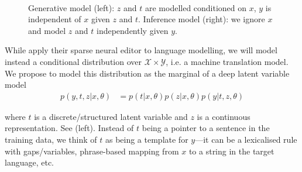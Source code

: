 \begin{figure}[t]
    \centering

    ~

    \caption{Generative model (left): $z$ and $t$ are modelled
        conditioned on $x$, $y$ is independent of $x$ given $z$ and $t$.
        Inference model (right): we ignore $x$ and model $z$ and $t$
        independently given $y$.} \label{fig:conditional}
\end{figure}

While \citet{he2020LearningSparsePrototypes} apply their sparse neural editor
to language modelling, we will model instead a conditional
distribution over $\mathcal{X} \times \mathcal{Y}$, i.e. a
machine translation model. We propose to model this distribution
as the marginal of a deep latent variable model
\begin{align}
    p(y, t, z|x, \theta) & =
    p(t | x, \theta)p(z |x, \theta)p(y |t, z, \theta)
\end{align}

\noindent where $t$ is a discrete/structured latent variable and $z$ is a
continuous representation. See  (left).
Instead of $t$ being a pointer to a sentence in the training data, we
think of $t$ as being a template for $y$---it can be a lexicalised
rule with gaps/variables, phrase-based mapping from $x$ to a string
in the target language, etc.

